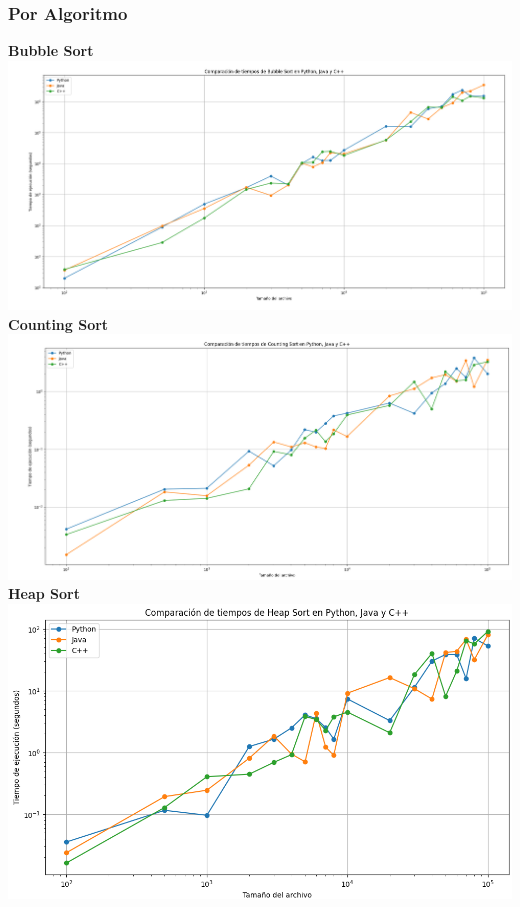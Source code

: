 \subsubsection{Por Algoritmo}
\textbf{Bubble Sort}
\includegraphics[scale=.25]{img/graficos/por algoritmo/bublesort.png}\\[0.2cm]
\textbf{Counting Sort}
\includegraphics[scale=.25]{img/graficos/por algoritmo/coungtingsort.png}\\[0.2cm]
\textbf{Heap Sort}
\includegraphics[scale=.25]{img/graficos/por algoritmo/heapsort.png}\\[0.2cm]
